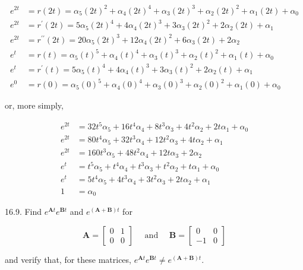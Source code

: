 \documentclass[10pt]{article}
\begin{document}
$$
\begin{aligned}
e^{2 t} & =r(2 t)=\alpha_{5}(2 t)^{2}+\alpha_{4}(2 t)^{4}+\alpha_{3}(2 t)^{3}+\alpha_{2}(2 t)^{2}+\alpha_{1}(2 t)+\alpha_{0} \\
e^{2 t} & =r^{\prime}(2 t)=5 \alpha_{5}(2 t)^{4}+4 \alpha_{4}(2 t)^{3}+3 \alpha_{3}(2 t)^{2}+2 \alpha_{2}(2 t)+\alpha_{1} \\
e^{2 t} & =r^{\prime \prime}(2 t)=20 \alpha_{5}(2 t)^{3}+12 \alpha_{4}(2 t)^{2}+6 \alpha_{3}(2 t)+2 \alpha_{2} \\
e^{t} & =r(t)=\alpha_{5}(t)^{5}+\alpha_{4}(t)^{4}+\alpha_{3}(t)^{3}+\alpha_{2}(t)^{2}+\alpha_{1}(t)+\alpha_{0} \\
e^{t} & =r^{\prime}(t)=5 \alpha_{5}(t)^{4}+4 \alpha_{4}(t)^{3}+3 \alpha_{3}(t)^{2}+2 \alpha_{2}(t)+\alpha_{1} \\
e^{0} & =r(0)=\alpha_{5}(0)^{5}+\alpha_{4}(0)^{4}+\alpha_{3}(0)^{3}+\alpha_{2}(0)^{2}+\alpha_{1}(0)+\alpha_{0}
\end{aligned}
$$

or, more simply,

$$
\begin{aligned}
e^{2 t} & =32 t^{5} \alpha_{5}+16 t^{4} \alpha_{4}+8 t^{3} \alpha_{3}+4 t^{2} \alpha_{2}+2 t \alpha_{1}+\alpha_{0} \\
e^{2 t} & =80 t^{4} \alpha_{5}+32 t^{3} \alpha_{4}+12 t^{2} \alpha_{3}+4 t \alpha_{2}+\alpha_{1} \\
e^{2 t} & =160 t^{3} \alpha_{5}+48 t^{2} \alpha_{4}+12 t \alpha_{3}+2 \alpha_{2} \\
e^{t} & =t^{5} \alpha_{5}+t^{4} \alpha_{4}+t^{3} \alpha_{3}+t^{2} \alpha_{2}+t \alpha_{1}+\alpha_{0} \\
e^{t} & =5 t^{4} \alpha_{5}+4 t^{3} \alpha_{4}+3 t^{2} \alpha_{3}+2 t \alpha_{2}+\alpha_{1} \\
1 & =\alpha_{0}
\end{aligned}
$$

16.9. Find $e^{\mathbf{A} t} e^{\mathbf{B} t}$ and $e^{(\mathbf{A}+\mathbf{B}) t}$ for

$$
\mathbf{A}=\left[\begin{array}{ll}
0 & 1 \\
0 & 0
\end{array}\right] \quad \text { and } \quad \mathbf{B}=\left[\begin{array}{rr}
0 & 0 \\
-1 & 0
\end{array}\right]
$$

and verify that, for these matrices, $e^{\mathbf{A} t} e^{\mathbf{B} t} \neq e^{(\mathbf{A}+\mathbf{B}) t}$.
\end{document}
